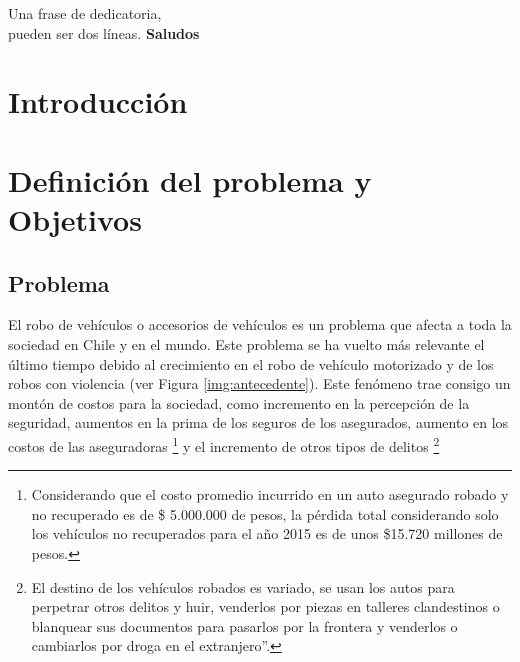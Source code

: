 \documentclass[letterpaper,12pt,oneside]{book} %
\begin{document}



\begin{dedicatoria}
	Una frase de dedicatoria, \\
	pueden ser dos líneas. \newp
	\textbf{Saludos}
\end{dedicatoria}

\begin{agradecimientos}
	\lipsum[1]
\end{agradecimientos}



\begin{resumen}
	\lipsum[1]
\end{resumen}


\hypersetup{
    citecolor=Blue
}
\chapter{Introducción}

\chapter{Definición del problema y Objetivos}
\section{Problema}
El robo de vehículos o accesorios de vehículos es un problema que afecta a toda la sociedad en Chile y en el mundo. Este problema se ha vuelto más relevante el último tiempo debido al crecimiento en el robo de vehículo motorizado y de los robos con violencia (ver Figura \ref{img:antecedente}). Este fenómeno trae consigo un montón de costos para la sociedad, como incremento en la percepción de la seguridad, aumentos en la prima de los seguros de los asegurados, aumento en los costos de las aseguradoras \footnote{Considerando que el costo promedio incurrido en un auto asegurado robado y no recuperado es de \$ 5.000.000 de pesos, la pérdida total considerando solo los vehículos no recuperados para el año 2015 es de unos \$15.720 millones de pesos.} y el incremento de otros tipos de delitos \footnote{El destino de los vehículos robados es variado, se usan los autos para perpetrar otros delitos y huir, venderlos por piezas en talleres clandestinos o blanquear sus documentos para pasarlos por la frontera y venderlos o cambiarlos por droga en el extranjero''.}
\end{document}
